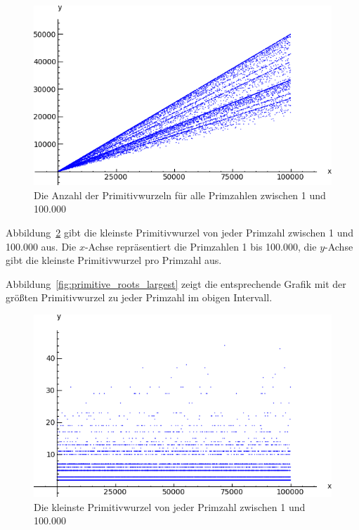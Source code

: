\begin{refsegment}
\begin{figure}[!htbp]
\centering
\includegraphics{figures/primitive-roots-all}
\caption{Die Anzahl der Primitivwurzeln für alle Primzahlen zwischen 1 und 100.000}
\label{fig:primitive_roots_all}
\end{figure}

Abbildung~\ref{fig:primitive_roots_smallest} gibt die kleinste Primitivwurzel
von jeder Primzahl zwischen 1 und 100.000 aus. Die $x$-Achse repräsentiert
die Primzahlen 1 bis 100.000, die $y$-Achse gibt die kleinste Primitivwurzel
pro Primzahl aus.

Abbildung~\ref{fig:primitive_roots_largest} zeigt die entsprechende Grafik
mit der größten Primitivwurzel zu jeder Primzahl im obigen Intervall.

\begin{figure}[!htbp]
\centering
\includegraphics{figures/primitive-roots-smallest.png}
\caption{Die kleinste Primitivwurzel von jeder Primzahl zwischen 1 und 100.000}
\label{fig:primitive_roots_smallest}
\end{figure}


\end{refsegment}
